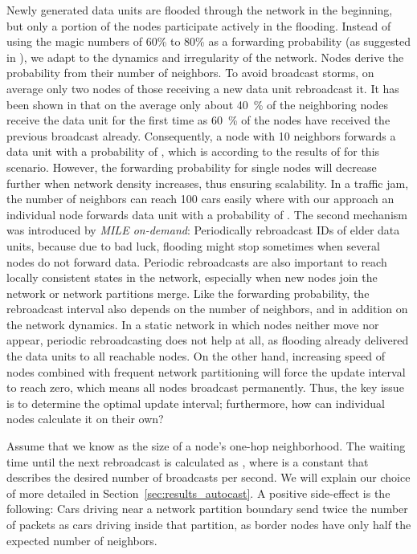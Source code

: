 \documentclass{acmrip}
\newcommand{\secref}[1]{Section~\ref{sec:#1}}
\begin{document}
Newly generated data units are flooded through the network in the
beginning, but only a portion of the nodes participate actively in
the flooding. Instead of using the magic numbers of 60\% to 80\% as
a forwarding probability (as suggested in \cite{867194}), we adapt
to the dynamics and irregularity of the network. Nodes derive the
probability from their number of neighbors. To avoid broadcast
storms, on average only two nodes of those receiving a new data unit
rebroadcast it. It has been shown in \cite{hellFisICWN02} that on
the average only about 40~\% of the neighboring nodes receive the
data unit for the first time as 60~\% of the nodes have received the
previous broadcast already. Consequently, a node with 10 neighbors
forwards a data unit with a probability of ,
which is according to the results of \cite{867194} for this
scenario.
However, the forwarding probability for single nodes will decrease further when network density increases, thus ensuring scalability. In a traffic jam, the number of neighbors can reach 100 cars easily where with our approach an individual node forwards data unit with a probability of .
The second mechanism was introduced by \textit{MILE on-demand}:
Periodically rebroadcast IDs of elder data units, because due to bad
luck, flooding might stop sometimes when several nodes do not
forward data. Periodic rebroadcasts are also important to reach
locally consistent states in the network, especially when new nodes
join the network or network partitions merge. Like the forwarding
probability, the rebroadcast interval also depends on the number of
neighbors, and in addition on the network dynamics. In a static
network in which nodes neither move nor appear, periodic
rebroadcasting does not help at all, as flooding already delivered
the data units to all reachable nodes. On the other hand, increasing
speed of nodes combined with frequent network partitioning will
force the update interval to reach zero, which means all nodes
broadcast permanently. Thus, the key issue is to determine the
optimal update interval; furthermore, how can individual nodes
calculate it on their own?

Assume that we know  as the size of a node's one-hop
neighborhood. The waiting time until the next rebroadcast is
calculated as , where  is a
constant that describes the desired number of broadcasts per second.
We will explain our choice of  more detailed in
\secref{results_autocast}. A positive side-effect is the following:
Cars driving near a network partition boundary send twice the number
of packets as cars driving inside that partition, as border nodes
have only half the expected number of neighbors.
\end{document}
